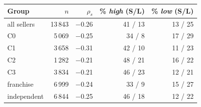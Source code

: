 \begin{tabular}{@{}lrrrr@{}}
\toprule
Group & $n$ & $\rho_s$ & \% \emph{high} (S/L) & \% \emph{low} (S/L) \\
\midrule
all sellers & 13\,843 & $-$0.26 & 41 / 13 & 13 / 25 \\
\midrule
C0 & 5\,069 & $-$0.25 & 34 / 8 & 17 / 29 \\
C1 & 3\,658 & $-$0.31 & 42 / 10 & 11 / 23 \\
C2 & 1\,282 & $-$0.21 & 48 / 21 & 16 / 22 \\
C3 & 3\,834 & $-$0.21 & 46 / 23 & 12 / 21 \\
\midrule
franchise & 6\,999 & $-$0.24 & 33 / 9 & 15 / 27 \\
independent & 6\,844 & $-$0.25 & 46 / 18 & 12 / 22 \\
\bottomrule
\end{tabular}

